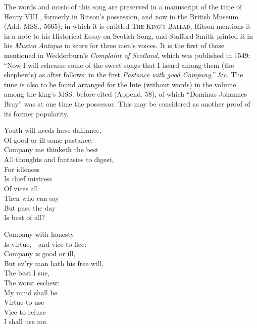 
The words and music of this song are preserved in a manuscript of the time of
Henry VIII., formerly in Ritson’s possession, and now in the British Museum
(Add. MSS., 5665); in which it is entitled \textsc{The King’s Ballad}. Ritson
mentions it in a note to his Historical Essay on Scotish Song, and Stafford Smith
printed it in his \textit{Musica Antiqua} in score for three men’s voices. It is the first of
those mentioned in Wedderburn’s \textit{Complaint of Scotland}, which was published in
1549: “Now I will rehearse some of the sweet songs that I heard among them
(the shepherds) as after follows: in the first \textit{Pastance with good Company},” \&c.
The tune is also to be found arranged for the lute (without words) in the volume
among the king’s MSS. before cited (Append. 58), of which “Dominus Johannes
Bray” was at one time the possessor. This may be considered as another proof
of its former popularity.

\noindent\begin{minipage}{\textwidth}
\vspace{-2\baselineskip}

\vspace{\baselineskip}

\end{minipage}

  \settowidth{\versewidth}{All thoughts and fantasies to digest,}

\begin{dcverse}\begin{patverse}
Youth will needs have dalliance,\\
Of good or ill some pastance;\\
Company me thinketh the best\\
All thoughts and fantasies to digest,\\
For idleness\\
Is chief mistress\\
Of vices all:\\
Then who can say\\
But pass the day\\
Is best of all?
\end{patverse}

\begin{patverse}
Company with honesty\\
Is virtue,—and vice to flee:\\
Company is good or ill,\\
But ev’ry man hath his free will,\\
The best I sue,\\
The worst eschew:\\
My mind shall be\\
Virtue to use\\
Vice to refuse\\
I shall use me.
\end{patverse}
\end{dcverse}

